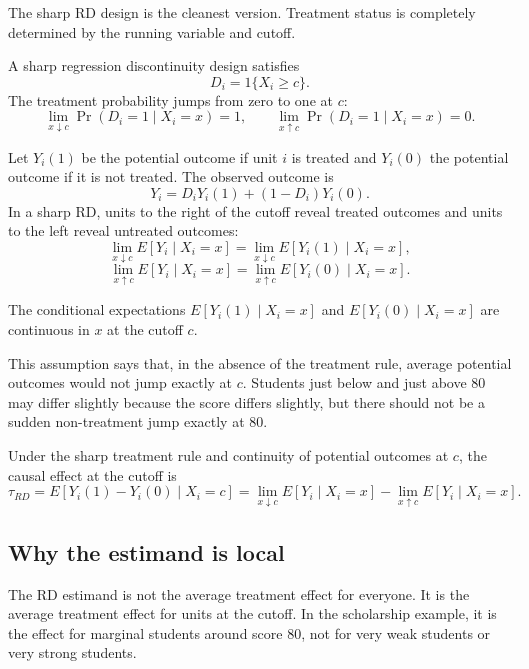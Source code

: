 The sharp RD design is the cleanest version. Treatment status is completely determined by the running variable and cutoff.

\begin{defN}[Sharp RD]
A sharp regression discontinuity design satisfies
\[
    D_i = 1\{X_i \geq c\}.
\]
The treatment probability jumps from zero to one at $c$:
\[
    \lim_{x \downarrow c} \Pr(D_i=1 \mid X_i=x) = 1,
    \qquad
    \lim_{x \uparrow c} \Pr(D_i=1 \mid X_i=x) = 0.
\]
\end{defN}

Let $Y_i(1)$ be the potential outcome if unit $i$ is treated and $Y_i(0)$ the potential outcome if it is not treated. The observed outcome is
\[
    Y_i = D_iY_i(1) + (1-D_i)Y_i(0).
\]
In a sharp RD, units to the right of the cutoff reveal treated outcomes and units to the left reveal untreated outcomes:
\[
    \lim_{x \downarrow c} E[Y_i \mid X_i=x]
    =
    \lim_{x \downarrow c} E[Y_i(1) \mid X_i=x],
\]
\[
    \lim_{x \uparrow c} E[Y_i \mid X_i=x]
    =
    \lim_{x \uparrow c} E[Y_i(0) \mid X_i=x].
\]

\begin{assN}
The conditional expectations $E[Y_i(1)\mid X_i=x]$ and $E[Y_i(0)\mid X_i=x]$ are continuous in $x$ at the cutoff $c$.
\end{assN}

This assumption says that, in the absence of the treatment rule, average potential outcomes would not jump exactly at $c$. Students just below and just above 80 may differ slightly because the score differs slightly, but there should not be a sudden non-treatment jump exactly at 80.

\begin{thmN}
Under the sharp treatment rule and continuity of potential outcomes at $c$, the causal effect at the cutoff is
\[
    \tau_{RD}
    =
    E[Y_i(1)-Y_i(0)\mid X_i=c]
    =
    \lim_{x \downarrow c} E[Y_i\mid X_i=x]
    -
    \lim_{x \uparrow c} E[Y_i\mid X_i=x].
\]
\end{thmN}

\subsection{Why the estimand is local}

The RD estimand is not the average treatment effect for everyone. It is the average treatment effect for units at the cutoff. In the scholarship example, it is the effect for marginal students around score 80, not for very weak students or very strong students.

